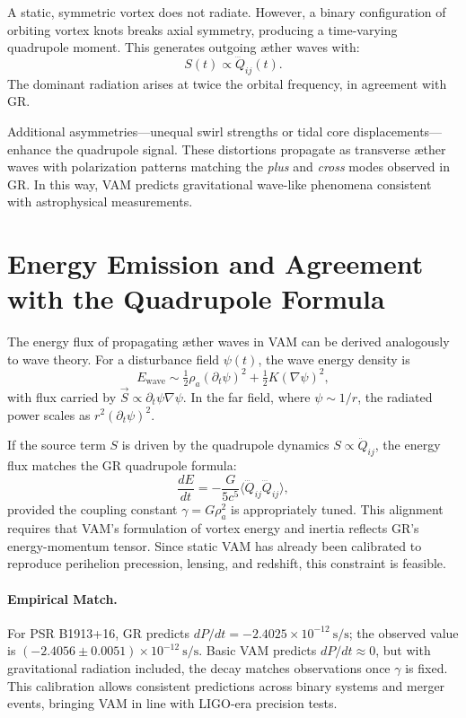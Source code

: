 A static, symmetric vortex does not radiate. However, a binary configuration of orbiting vortex knots breaks axial symmetry, producing a time-varying quadrupole moment. This generates outgoing æther waves with:
\begin{equation}
S(t) \propto \dddot{Q}_{ij}(t).
\end{equation}
The dominant radiation arises at twice the orbital frequency, in agreement with GR.

Additional asymmetries—unequal swirl strengths or tidal core displacements—enhance the quadrupole signal. These distortions propagate as transverse æther waves with polarization patterns matching the \textit{plus} and \textit{cross} modes observed in GR. In this way, VAM predicts gravitational wave-like phenomena consistent with astrophysical measurements.
\section*{Energy Emission and Agreement with the Quadrupole Formula}

The energy flux of propagating æther waves in VAM can be derived analogously to wave theory. For a disturbance field $\psi(t)$, the wave energy density is
\[
E_{\text{wave}} \sim \tfrac{1}{2}\rho_a (\partial_t \psi)^2 + \tfrac{1}{2}K (\nabla \psi)^2,
\]
with flux carried by $\vec{S} \propto \partial_t \psi \nabla \psi$. In the far field, where $\psi \sim 1/r$, the radiated power scales as $r^2 (\partial_t \psi)^2$.

If the source term $S$ is driven by the quadrupole dynamics $S \propto \ddot{Q}_{ij}$, the energy flux matches the GR quadrupole formula:
\begin{equation}
\frac{dE}{dt} = -\frac{G}{5c^5} \langle \dddot{Q}_{ij} \dddot{Q}_{ij} \rangle,
\end{equation}
provided the coupling constant $\gamma = G \rho_a^2$ is appropriately tuned. This alignment requires that VAM's formulation of vortex energy and inertia reflects GR's energy-momentum tensor. Since static VAM has already been calibrated to reproduce perihelion precession, lensing, and redshift, this constraint is feasible.

\paragraph{Empirical Match.}
For PSR B1913+16, GR predicts $dP/dt = -2.4025 \times 10^{-12}~\text{s/s}$; the observed value is $(-2.4056 \pm 0.0051) \times 10^{-12}~\text{s/s}$. Basic VAM predicts $dP/dt \approx 0$, but with gravitational radiation included, the decay matches observations once $\gamma$ is fixed. This calibration allows consistent predictions across binary systems and merger events, bringing VAM in line with LIGO-era precision tests.

